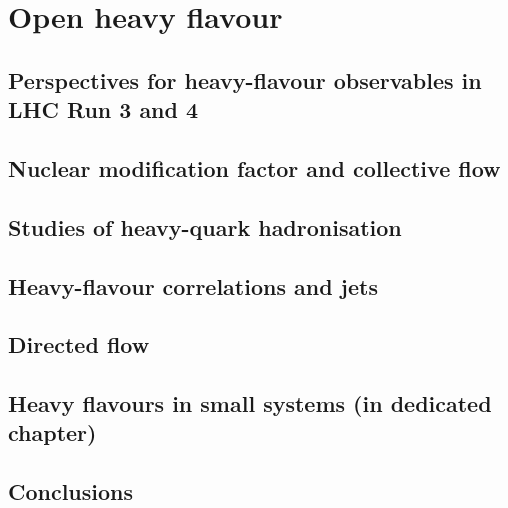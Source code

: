 \documentclass[../report.tex]{subfiles}
\providecommand{\main}{..}
\begin{document}
\section{Open heavy flavour}
\label{sec:HI_HF}


\subsection{Perspectives for heavy-flavour observables in LHC Run 3 and 4}


\subsection{Nuclear modification factor and collective flow}


\subsection{Studies of heavy-quark hadronisation}


\subsection{Heavy-flavour correlations and jets}


\subsection{Directed flow}



\subsection{Heavy flavours in small systems (in dedicated chapter)}



\subsection{Conclusions}

\end{document}
